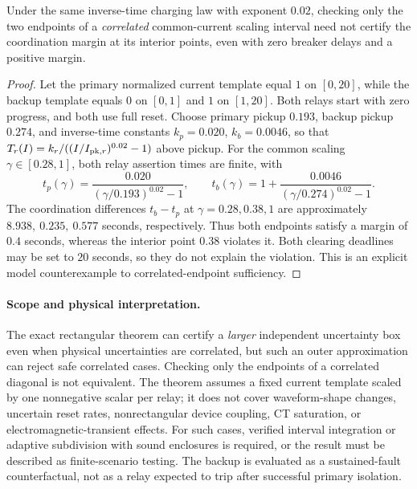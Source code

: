 \begin{proposition}
\label{prop:p13-counterexample}
Under the same inverse-time charging law with exponent \(0.02\), checking only the two endpoints of a \emph{correlated} common-current scaling interval need not certify the coordination margin at its interior points, even with zero breaker delays and a positive margin.
\end{proposition}
\begin{proof}
Let the primary normalized current template equal \(1\) on \([0,20]\), while the backup template equals \(0\) on \([0,1]\) and \(1\) on \([1,20]\). Both relays start with zero progress, and both use full reset. Choose primary pickup \(0.193\), backup pickup \(0.274\), and inverse-time constants \(k_p=0.020\), \(k_b=0.0046\), so that \(T_r(I)=k_r/((I/I_{{\rm pk},r})^{0.02}-1)\) above pickup. For the common scaling \(\gamma\in[0.28,1]\), both relay assertion times are finite, with
\[
t_p(\gamma)=\frac{0.020}{(\gamma/0.193)^{0.02}-1},\qquad
t_b(\gamma)=1+\frac{0.0046}{(\gamma/0.274)^{0.02}-1}.
\]
The coordination differences \(t_b-t_p\) at \(\gamma=0.28,0.38,1\) are approximately \(8.938,\ 0.235,\ 0.577\) seconds, respectively. Thus both endpoints satisfy a margin of \(0.4\) seconds, whereas the interior point \(0.38\) violates it. Both clearing deadlines may be set to \(20\) seconds, so they do not explain the violation. This is an explicit model counterexample to correlated-endpoint sufficiency.
\end{proof}

\paragraph{Scope and physical interpretation.}
The exact rectangular theorem can certify a \emph{larger} independent uncertainty box even when physical uncertainties are correlated, but such an outer approximation can reject safe correlated cases. Checking only the endpoints of a correlated diagonal is not equivalent. The theorem assumes a fixed current template scaled by one nonnegative scalar per relay; it does not cover waveform-shape changes, uncertain reset rates, nonrectangular device coupling, CT saturation, or electromagnetic-transient effects. For such cases, verified interval integration or adaptive subdivision with sound enclosures is required, or the result must be described as finite-scenario testing. The backup is evaluated as a sustained-fault counterfactual, not as a relay expected to trip after successful primary isolation.